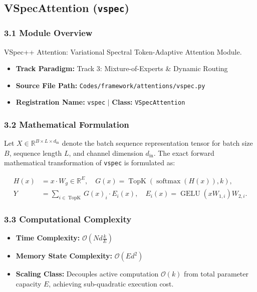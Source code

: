 \subsection{VSpecAttention (\texttt{vspec})}
\label{sec:app_module_vspec}

\subsubsection*{3.1 Module Overview}
VSpec++ Attention: Variational Spectral Token-Adaptive Attention Module.
\begin{itemize}
    \item \textbf{Track Paradigm:} Track 3: Mixture-of-Experts \& Dynamic Routing
    \item \textbf{Source File Path:} \texttt{Codes/framework/attentions/vspec.py}
    \item \textbf{Registration Name:} \texttt{vspec} $\mid$ \textbf{Class:} \texttt{VSpecAttention}
\end{itemize}

\subsubsection*{3.2 Mathematical Formulation}
Let $X \in \mathbb{R}^{B \times L \times d_{\text{in}}}$ denote the batch sequence representation tensor for batch size $B$, sequence length $L$, and channel dimension $d_{\text{in}}$. The exact forward mathematical transformation of \texttt{vspec} is formulated as:

\begin{align}
H(x) &= x \cdot W_g \in \mathbb{R}^{E}, \quad G(x) = \operatorname{TopK}\left(\operatorname{softmax}(H(x)), k\right), \\
Y &= \sum_{i \in \operatorname{TopK}} G(x)_i \cdot E_i(x), \quad E_i(x) = \operatorname{GELU}(x W_{1, i}) W_{2, i}.
\end{align}


\subsubsection*{3.3 Computational Complexity}
\begin{itemize}
    \item \textbf{Time Complexity:} $\mathcal{O}(N d \frac{k}{E})$
    \item \textbf{Memory State Complexity:} $\mathcal{O}(E d^2)$
    \item \textbf{Scaling Class:} Decouples active computation $\mathcal{O}(k)$ from total parameter capacity $E$, achieving sub-quadratic execution cost.
\end{itemize}


